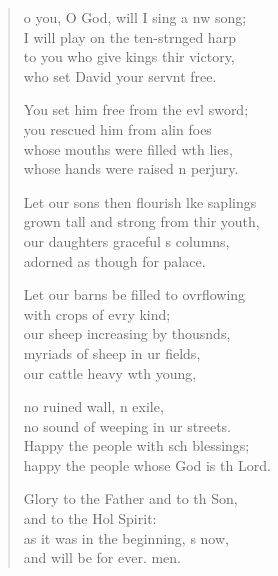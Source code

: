 \settowidth{\versewidth}{Let our sons then flourish like saplings *}
\begin{verse}%
  \begin{patverse}
o you, O God, will I sing a nw song;\Med\\
I will play on the ten-str\pointup{\i}nged harp\\
to you who give kings thir victory,\Med\\
who set David your servnt free.

You set him free from the ev\pointup{\i}l sword;\Med\\
you rescued him from alin foes\\
whose mouths were filled w\pointup{\i}th lies,\Med\\
whose hands were raised \pointup{\i}n perjury.

Let our sons then flourish l\pointup{\i}ke saplings\Med\\
grown tall and strong from thir youth,\\
our daughters graceful s columns,\Med\\
adorned as though for  palace.

Let our barns be filled to ovrflowing\Med\\
with crops of evry kind;\\
our sheep increasing by thousnds,\Flex\\
myriads of sheep in ur fields,\Med\\
our cattle heavy w\pointup{\i}th young,

no ruined wall, n exile,\Med\\
no sound of weeping in ur streets.\\
Happy the people with sch blessings;\Med\\
happy the people whose God is th Lord.

Glory to the Father and to th Son,\Med\\
and to the Hol Spirit:\\
as it was in the beginning, \pointup{\i}s now,\Med\\
and will be for ever. men.
  \end{patverse}
\end{verse}
